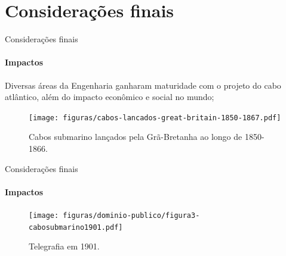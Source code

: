 \documentclass[aspectratio=169]{beamer}
\begin{document}
\section{Considerações finais}

\begin{frame}{Considerações finais}
\framesubtitle{Impactos}
Diversas áreas da Engenharia ganharam maturidade com o projeto do cabo atlântico, além do impacto econômico e social no mundo;
\begin{figure}[hbtp]
	\centering
	\texttt{[image: figuras/cabos-lancados-great-britain-1850-1867.pdf]}
	\caption{Cabos submarino lançados pela Grã-Bretanha ao longo de 1850-1866.} 
	\label{fig:cabos1} 
\end{figure}
\end{frame}

\begin{frame}{Considerações finais}
\framesubtitle{Impactos}
\begin{figure}
	\centering
	\texttt{[image: figuras/dominio-publico/figura3-cabosubmarino1901.pdf]}
	\caption{Telegrafia em 1901.}
	\label{fig:12} 
\end{figure} 
\end{frame}
\end{document}
